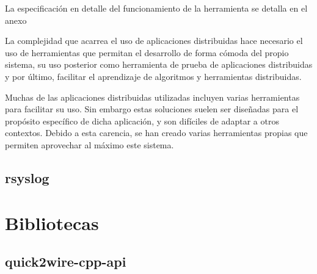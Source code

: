 La especificación en detalle del funcionamiento de la herramienta se detalla en el anexo%






La complejidad que acarrea el uso de aplicaciones distribuidas hace necesario el uso de herramientas que permitan el desarrollo de forma cómoda del propio sistema, su uso posterior como herramienta de prueba de aplicaciones distribuidas y por último, facilitar el aprendizaje de algoritmos y herramientas distribuidas.

Muchas de las aplicaciones distribuidas utilizadas incluyen varias herramientas para facilitar su uso. Sin embargo estas soluciones suelen ser diseñadas para el propósito específico de dicha aplicación, y son difíciles de adaptar a otros contextos. Debido a esta carencia, se han creado varias herramientas propias que permiten aprovechar al máximo este sistema.


\subsection{rsyslog}

\section{Bibliotecas}

\subsection{quick2wire-cpp-api}